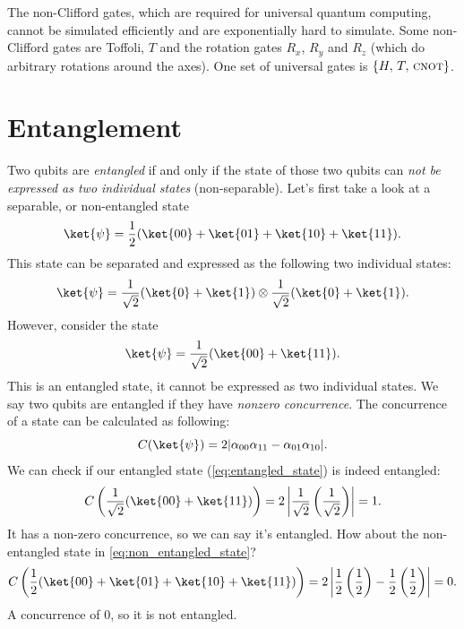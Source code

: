 \documentclass[11pt, notitlepage]{report}
\begin{document}
The non-Clifford gates, which are required for universal quantum computing, cannot be simulated efficiently and are exponentially hard to simulate. Some non-Clifford gates are Toffoli, $T$ and the rotation gates $R_x$, $R_y$ and $R_z$ (which do arbitrary rotations around the axes). One set of universal gates is $\{H,\, T,\, \textsc{cnot}\}$.

\section{Entanglement}
Two qubits are \emph{entangled} if and only if the state of those two qubits can \emph{not be expressed as two individual states} (non-separable). Let's first take a look at a separable, or non-entangled state
\begin{equation} \label{eq:non_entangled_state}
  \ket{\psi} = \dfrac{1}{2}(\ket{00} + \ket{01} + \ket{10} + \ket{11}).
\end{equation}
This state can be separated and expressed as the following two individual states:
\begin{equation}
  \ket{\psi} = \dfrac{1}{\sqrt2}(\ket{0} + \ket{1}) \otimes \dfrac{1}{\sqrt2}(\ket{0} + \ket{1}).
\end{equation}
However, consider the state
\begin{equation} \label{eq:entangled_state}
  \ket{\psi} = \dfrac{1}{\sqrt2}(\ket{00} + \ket{11}).
\end{equation}
This is an entangled state, it cannot be expressed as two individual states. We say two qubits are entangled if they have \emph{nonzero concurrence}. The concurrence of a state can be calculated as following:
\begin{equation}
  C(\ket{\psi}) = 2|\alpha_{00}\alpha_{11} - \alpha_{01}\alpha_{10}|.
\end{equation}
We can check if our entangled state (\ref{eq:entangled_state}) is indeed entangled:
\begin{equation}
  C\left(\dfrac{1}{\sqrt2}(\ket{00} + \ket{11})\right) = 2\left|\dfrac{1}{\sqrt2}\left(\dfrac{1}{\sqrt2}\right)\right| = 1.
\end{equation}
It has a non-zero concurrence, so we can say it's entangled. How about the non-entangled state in \ref{eq:non_entangled_state}?
\begin{equation}
  C\left(\dfrac{1}{2}(\ket{00} + \ket{01} + \ket{10} + \ket{11})\right) = 2\left|\dfrac{1}{2}\left(\dfrac{1}{2}\right) - \dfrac{1}{2}\left(\dfrac{1}{2}\right)\right| = 0.
\end{equation}
A concurrence of 0, so it is not entangled.
\end{document}
